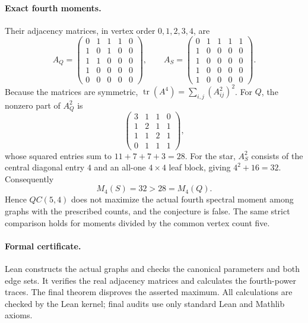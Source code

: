 \documentclass[11pt]{article}
\begin{document}
\paragraph{Exact fourth moments.}
Their adjacency matrices, in vertex order $0,1,2,3,4$, are
\[
 A_Q=\begin{pmatrix}
 0&1&1&1&0\\1&0&1&0&0\\1&1&0&0&0\\1&0&0&0&0\\0&0&0&0&0
 \end{pmatrix},\qquad
 A_S=\begin{pmatrix}
 0&1&1&1&1\\1&0&0&0&0\\1&0&0&0&0\\1&0&0&0&0\\1&0&0&0&0
 \end{pmatrix}.
\]
Because the matrices are symmetric,
$\operatorname{tr}(A^4)=\sum_{i,j}(A^2_{ij})^2$.
For $Q$, the nonzero part of $A_Q^2$ is
\[
 \begin{pmatrix}3&1&1&0\\1&2&1&1\\1&1&2&1\\0&1&1&1\end{pmatrix},
\]
whose squared entries sum to $11+7+7+3=28$. For the star, $A_S^2$ consists of the central diagonal
entry $4$ and an all-one $4\times4$ leaf block, giving
$4^2+16=32$. Consequently
\[
 M_4(S)=32>28=M_4(Q).
\]
Hence $QC(5,4)$ does not maximize the actual fourth spectral
moment among graphs with the prescribed counts, and the conjecture
is false. The same strict comparison holds for moments divided by
the common vertex count five.

\paragraph{Formal certificate.}
Lean constructs the actual graphs and checks the canonical parameters
and both edge sets. It verifies the real adjacency matrices and
calculates the fourth-power traces. The final theorem disproves the
asserted maximum. All calculations are checked by the Lean kernel;
final audits use only standard Lean and Mathlib axioms.
\end{document}
